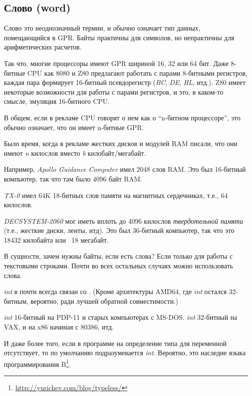 \subsection{Слово (word)}

Слово  это неоднозначный термин, и обычно означает тип данных, помещающийся в \ac{GPR}.
Байты практичны для символов, но непрактичны для арифметических расчетов.

Так что, многие процессоры имеют \ac{GPR} шириной 16, 32 или 64 бит.
Даже 8-битные \ac{CPU} как 8080 и Z80 предлагают работать с парами 8-битными регистров, каждая пара формирует 16-битный
псевдорегистр
(\emph{BC}, \emph{DE}, \emph{HL}, итд.).
Z80 имеет некоторые возможности для работы с парами регистров, и это, в каком-то смысле, эмуляция 16-битного CPU.

В общем, если в рекламе CPU говорят о нем как о ``n-битном процессоре'', это обычно означает, что он имеет n-битные \ac{GPR}.

Было время, когда в рекламе жестких дисков и модулей \ac{RAM} писали, что они имеют \emph{n} килослов вместо
\emph{b} килобайт/мегабайт.

Например, \emph{Apollo Guidance Computer}
имел 2048 слов \ac{RAM}.
Это был 16-битный компьютер, так что там было 4096 байт \ac{RAM}.

\emph{TX-0} имел 64K 18-битных слов памяти на магнитных сердечниках,
т.е., 64 килослов.

\emph{DECSYSTEM-2060}
мог иметь вплоть до 4096 килослов \emph{твердотельной памяти}
(т.е., жесткие диски, ленты, итд).
Это был 36-битный компьютер, так что это 18432 килобайта или ~18 мегабайт.

В сущности, зачем нужны байты, если есть слова?
Если только для работы с текстовыми строками.
Почти во всех остальных случаях можно использовать слова.

\myhrule{}

\emph{int} в \CCpp почти всегда связан со .
(Кроме архитектуры AMD64, где \emph{int} остался 32-битным, вероятно, ради лучшей обратной совместимости.)

\emph{int} 16-битный на PDP-11 и старых компьютерах с MS-DOS.
\emph{int} 32-битный на VAX, и на x86 начиная с 80386, итд.

И даже более того, если в программе на \CCpp{} определение типа для переменной отсутствует,
то по умолчанию подразумевается \emph{int}.
Вероятно, это наследие языка программирования B\footnote{\url{http://yurichev.com/blog/typeless/}}.

